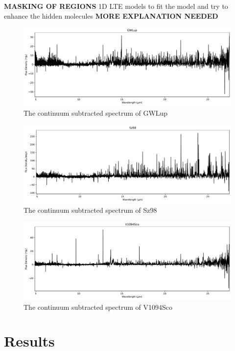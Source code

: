 \documentclass[twoside, single, authoryear, semicolon]{lion-msc}
\newcommand{\4}{$_4$}
\newcommand{\3}{$_3$}
\newcommand{\2}{$_2$}
\begin{document}
\textbf{MASKING OF REGIONS}
1D LTE models to fit the model and try to enhance the hidden molecules
\textbf{MORE EXPLANATION NEEDED}
\begin{figure}[!ht]
    \centering
    \includegraphics[width=\linewidth]{Figures/FullSpectrum_GWLup.pdf}
    \caption{The continuum subtracted spectrum of GWLup}
    \label{fig: GWLup}
\end{figure}
\begin{figure}[!ht]
    \centering
    \includegraphics[width=\linewidth]{Figures/FullSpectrum_Sz98.pdf}
    \caption{The continuum subtracted spectrum of Sz98}
    \label{fig: Sz98}
\end{figure}
\begin{figure}[!ht]
    \centering
    \includegraphics[width=\linewidth]{Figures/FullSpectrum_V1094Sco.pdf}
    \caption{The continuum subtracted spectrum of V1094Sco}
    \label{fig: V1094Sco}
\end{figure}



\chapter{Results}\label{Ch: Results}
\end{document}
